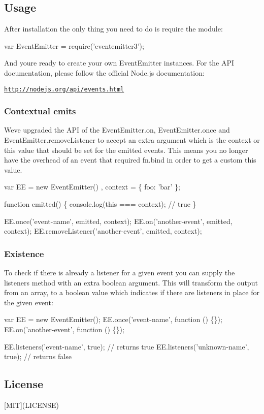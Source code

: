 \subsection*{Usage}

After installation the only thing you need to do is require the module\+:


\begin{DoxyCode}
var EventEmitter = require('eventemitter3');
\end{DoxyCode}


And you\textquotesingle{}re ready to create your own Event\+Emitter instances. For the A\+PI documentation, please follow the official Node.\+js documentation\+:

\href{http://nodejs.org/api/events.html}{\tt http\+://nodejs.\+org/api/events.\+html}

\subsubsection*{Contextual emits}

We\textquotesingle{}ve upgraded the A\+PI of the {\ttfamily Event\+Emitter.\+on}, {\ttfamily Event\+Emitter.\+once} and {\ttfamily Event\+Emitter.\+remove\+Listener} to accept an extra argument which is the {\ttfamily context} or {\ttfamily this} value that should be set for the emitted events. This means you no longer have the overhead of an event that required {\ttfamily fn.\+bind} in order to get a custom {\ttfamily this} value.


\begin{DoxyCode}
var EE = new EventEmitter()
  , context = \{ foo: 'bar' \};

function emitted() \{
  console.log(this === context); // true
\}

EE.once('event-name', emitted, context);
EE.on('another-event', emitted, context);
EE.removeListener('another-event', emitted, context);
\end{DoxyCode}


\subsubsection*{Existence}

To check if there is already a listener for a given event you can supply the {\ttfamily listeners} method with an extra boolean argument. This will transform the output from an array, to a boolean value which indicates if there are listeners in place for the given event\+:


\begin{DoxyCode}
var EE = new EventEmitter();
EE.once('event-name', function () \{\});
EE.on('another-event', function () \{\});

EE.listeners('event-name', true); // returns true
EE.listeners('unknown-name', true); // returns false
\end{DoxyCode}


\subsection*{License}

\mbox{[}M\+IT\mbox{]}(L\+I\+C\+E\+N\+SE) 